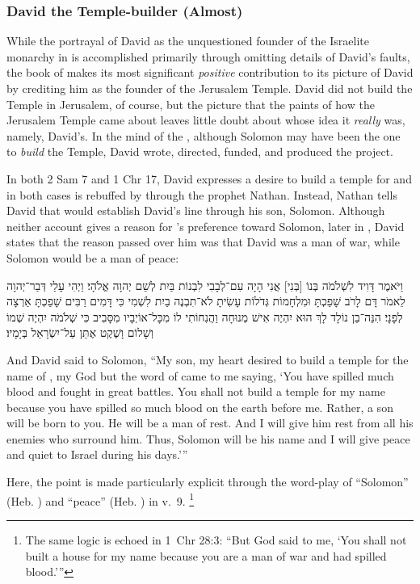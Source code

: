 \subsubsection{David the Temple-builder (Almost)}
While the portrayal of David as the unquestioned founder of the Israelite monarchy in \chronicles is accomplished primarily through omitting details of David's faults, the book of \chronicles makes its most significant \emph{positive} contribution to its picture of David by crediting him as the founder of the Jerusalem Temple. David did not build the Temple in Jerusalem, of course, but the picture that the \chronicler paints of how the Jerusalem Temple came about leaves little doubt about whose idea it \emph{really} was, namely, David's. In the mind of the \chronicler, although Solomon may have been the one to \emph{build} the Temple, David wrote, directed, funded, and produced the project.

In both 2 Sam 7 and 1 Chr 17, David expresses a desire to build a temple for \yahweh and in both cases is rebuffed by \yahweh through the prophet Nathan. Instead, Nathan tells David that \yahweh would establish David's line through his son, Solomon. Although neither account gives a reason for \yahweh's preference toward Solomon, later in \chronicles, David states that the reason \yahweh passed over him was that David was a man of war, while Solomon would be a man of peace:

\begin{hebrewtext}
    וַיֹּאמֶר דָּוִיד לִשְׁלֹמֹה בְּנוֹ [בְּנִי] אֲנִי הָיָה עִם־לְבָבִי לִבְנוֹת בַּיִת לְשֵׁם יְהוָה אֱלֹהָי׃ 
    וַיְהִי עָלַי דְּבַר־יְהוָה לֵאמֹר דָּם לָרֹב שָׁפַכְתָּ וּמִלְחָמוֹת גְּדֹלוֹת עָשִׂיתָ לֹא־תִבְנֶה בַיִת לִשְׁמִי כִּי דָּמִים רַבִּים שָׁפַכְתָּ אַרְצָה לְפָנָי׃
    הִנֵּה־בֵן נוֹלָד לָךְ הוּא יִהְיֶה אִישׁ מְנוּחָה וַהֲנִחוֹתִי לוֹ מִכָּל־אוֹיְבָיו מִסָּבִיב כִּי שְׁלֹמֹה יִהְיֶה שְׁמוֹ וְשָׁלוֹם וָשֶׁקֶט אֶתֵּן עַל־יִשְׂרָאֵל בְּיָמָיו׃
\end{hebrewtext}
\begin{translation}
    And David said to Solomon, ``My son, my heart desired to build a temple for the name of \yahweh, my God
    but the word of \yahweh came to me saying, `You have spilled much blood and fought in great battles. You shall not build a temple for my name because you have spilled so much blood on the earth before me.
    Rather, a son will be born to you. He will be a man of rest. And I will give him rest from all his enemies who surround him. Thus, Solomon will be his name and I will give peace and quiet to Israel during his days.'''
\end{translation}
\noindent
Here, the point is made particularly explicit through the word-play of ``Solomon'' (Heb. ) and ``peace'' (Heb. ) in v.~9.%
    \footnote{The same logic is echoed in 1~Chr 28:3:  ``But God said to me, `You shall not built a house for my name because you are a man of war and had spilled blood.'''}

